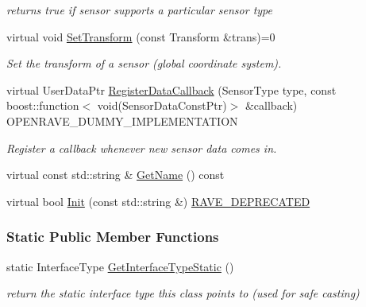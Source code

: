 \begin{DoxyCompactItemize}
\begin{DoxyCompactList}\small\item\em returns true if sensor supports a particular sensor type \item\end{DoxyCompactList}\item 
virtual void \hyperlink{classOpenRAVE_1_1SensorBase_a2b064fc102932710baf4ada2799d7236}{SetTransform} (const Transform \&trans)=0
\begin{DoxyCompactList}\small\item\em Set the transform of a sensor (global coordinate system). \item\end{DoxyCompactList}\item 
virtual UserDataPtr \hyperlink{classOpenRAVE_1_1SensorBase_ab17d44ea62751790d35594754f7069e5}{RegisterDataCallback} (SensorType type, const boost::function$<$ void(SensorDataConstPtr)$>$ \&callback) OPENRAVE\_\-DUMMY\_\-IMPLEMENTATION
\begin{DoxyCompactList}\small\item\em Register a callback whenever new sensor data comes in. \item\end{DoxyCompactList}\item 
virtual const std::string \& \hyperlink{classOpenRAVE_1_1SensorBase_a3cc720dbc55fa8e07a0f85343d3bb136}{GetName} () const 
\item 
virtual bool \hyperlink{classOpenRAVE_1_1SensorBase_a90092f801b2f4091b5509d6ea1307ce9}{Init} (const std::string \&) \hyperlink{namespaceOpenRAVE_af23fc4c2c72950a8c02f38ef71680bc6}{RAVE\_\-DEPRECATED}
\end{DoxyCompactItemize}
\subsubsection*{Static Public Member Functions}
\begin{DoxyCompactItemize}
\item 
\hypertarget{classOpenRAVE_1_1SensorBase_affeafe65e7c4094f282d273dedbf069b}{
static InterfaceType \hyperlink{classOpenRAVE_1_1SensorBase_affeafe65e7c4094f282d273dedbf069b}{GetInterfaceTypeStatic} ()}
\label{classOpenRAVE_1_1SensorBase_affeafe65e7c4094f282d273dedbf069b}

\begin{DoxyCompactList}\small\item\em return the static interface type this class points to (used for safe casting) \item\end{DoxyCompactList}\end{DoxyCompactItemize}
